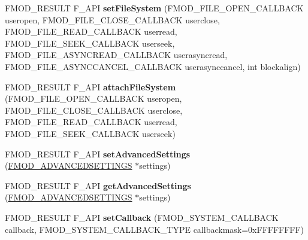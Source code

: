 \begin{DoxyCompactItemize}
\item 
\hypertarget{class_f_m_o_d_1_1_system_a44b483cf478ab779944108f5ee724a77}{F\+M\+O\+D\+\_\+\+R\+E\+S\+U\+L\+T F\+\_\+\+A\+P\+I {\bfseries set\+File\+System} (F\+M\+O\+D\+\_\+\+F\+I\+L\+E\+\_\+\+O\+P\+E\+N\+\_\+\+C\+A\+L\+L\+B\+A\+C\+K useropen, F\+M\+O\+D\+\_\+\+F\+I\+L\+E\+\_\+\+C\+L\+O\+S\+E\+\_\+\+C\+A\+L\+L\+B\+A\+C\+K userclose, F\+M\+O\+D\+\_\+\+F\+I\+L\+E\+\_\+\+R\+E\+A\+D\+\_\+\+C\+A\+L\+L\+B\+A\+C\+K userread, F\+M\+O\+D\+\_\+\+F\+I\+L\+E\+\_\+\+S\+E\+E\+K\+\_\+\+C\+A\+L\+L\+B\+A\+C\+K userseek, F\+M\+O\+D\+\_\+\+F\+I\+L\+E\+\_\+\+A\+S\+Y\+N\+C\+R\+E\+A\+D\+\_\+\+C\+A\+L\+L\+B\+A\+C\+K userasyncread, F\+M\+O\+D\+\_\+\+F\+I\+L\+E\+\_\+\+A\+S\+Y\+N\+C\+C\+A\+N\+C\+E\+L\+\_\+\+C\+A\+L\+L\+B\+A\+C\+K userasynccancel, int blockalign)}\label{class_f_m_o_d_1_1_system_a44b483cf478ab779944108f5ee724a77}

\item 
\hypertarget{class_f_m_o_d_1_1_system_a1ba3740700c658162387ae161745e39a}{F\+M\+O\+D\+\_\+\+R\+E\+S\+U\+L\+T F\+\_\+\+A\+P\+I {\bfseries attach\+File\+System} (F\+M\+O\+D\+\_\+\+F\+I\+L\+E\+\_\+\+O\+P\+E\+N\+\_\+\+C\+A\+L\+L\+B\+A\+C\+K useropen, F\+M\+O\+D\+\_\+\+F\+I\+L\+E\+\_\+\+C\+L\+O\+S\+E\+\_\+\+C\+A\+L\+L\+B\+A\+C\+K userclose, F\+M\+O\+D\+\_\+\+F\+I\+L\+E\+\_\+\+R\+E\+A\+D\+\_\+\+C\+A\+L\+L\+B\+A\+C\+K userread, F\+M\+O\+D\+\_\+\+F\+I\+L\+E\+\_\+\+S\+E\+E\+K\+\_\+\+C\+A\+L\+L\+B\+A\+C\+K userseek)}\label{class_f_m_o_d_1_1_system_a1ba3740700c658162387ae161745e39a}

\item 
\hypertarget{class_f_m_o_d_1_1_system_a8e7c0f550c5c540d8889fb835992cff5}{F\+M\+O\+D\+\_\+\+R\+E\+S\+U\+L\+T F\+\_\+\+A\+P\+I {\bfseries set\+Advanced\+Settings} (\hyperlink{struct_f_m_o_d___a_d_v_a_n_c_e_d_s_e_t_t_i_n_g_s}{F\+M\+O\+D\+\_\+\+A\+D\+V\+A\+N\+C\+E\+D\+S\+E\+T\+T\+I\+N\+G\+S} $\ast$settings)}\label{class_f_m_o_d_1_1_system_a8e7c0f550c5c540d8889fb835992cff5}

\item 
\hypertarget{class_f_m_o_d_1_1_system_a9c111315da6297cb6889aedfd46c3daa}{F\+M\+O\+D\+\_\+\+R\+E\+S\+U\+L\+T F\+\_\+\+A\+P\+I {\bfseries get\+Advanced\+Settings} (\hyperlink{struct_f_m_o_d___a_d_v_a_n_c_e_d_s_e_t_t_i_n_g_s}{F\+M\+O\+D\+\_\+\+A\+D\+V\+A\+N\+C\+E\+D\+S\+E\+T\+T\+I\+N\+G\+S} $\ast$settings)}\label{class_f_m_o_d_1_1_system_a9c111315da6297cb6889aedfd46c3daa}

\item 
\hypertarget{class_f_m_o_d_1_1_system_a70f579154de7d2ba3ca958d4c83707f1}{F\+M\+O\+D\+\_\+\+R\+E\+S\+U\+L\+T F\+\_\+\+A\+P\+I {\bfseries set\+Callback} (F\+M\+O\+D\+\_\+\+S\+Y\+S\+T\+E\+M\+\_\+\+C\+A\+L\+L\+B\+A\+C\+K callback, F\+M\+O\+D\+\_\+\+S\+Y\+S\+T\+E\+M\+\_\+\+C\+A\+L\+L\+B\+A\+C\+K\+\_\+\+T\+Y\+P\+E callbackmask=0x\+F\+F\+F\+F\+F\+F\+F\+F)}\label{class_f_m_o_d_1_1_system_a70f579154de7d2ba3ca958d4c83707f1}


\end{DoxyCompactItemize}
